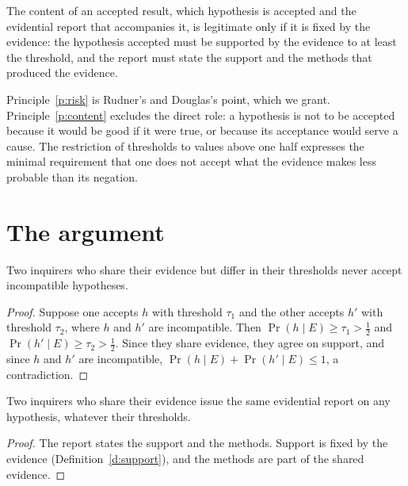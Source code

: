 \documentclass{situationist-preprint}
\begin{document}
\begin{principle}\label{p:content}
The content of an accepted result, which hypothesis is accepted and the evidential report that accompanies it, is legitimate only if it is fixed by the evidence: the hypothesis accepted must be supported by the evidence to at least the threshold, and the report must state the support and the methods that produced the evidence.
\end{principle}

Principle~\ref{p:risk} is Rudner's and Douglas's point, which we grant. Principle~\ref{p:content} excludes the direct role: a hypothesis is not to be accepted because it would be good if it were true, or because its acceptance would serve a cause. The restriction of thresholds to values above one half expresses the minimal requirement that one does not accept what the evidence makes less probable than its negation.

\section{The argument}

\begin{proposition}\label{p:noconflict}
Two inquirers who share their evidence but differ in their thresholds never accept incompatible hypotheses.
\end{proposition}

\begin{proof}
Suppose one accepts $h$ with threshold $\tau_1$ and the other accepts $h'$ with threshold $\tau_2$, where $h$ and $h'$ are incompatible. Then $\Pr(h \mid E) \ge \tau_1 > \tfrac12$ and $\Pr(h' \mid E) \ge \tau_2 > \tfrac12$. Since they share evidence, they agree on support, and since $h$ and $h'$ are incompatible, $\Pr(h \mid E) + \Pr(h' \mid E) \le 1$, a contradiction.
\end{proof}

\begin{proposition}\label{p:report}
Two inquirers who share their evidence issue the same evidential report on any hypothesis, whatever their thresholds.
\end{proposition}

\begin{proof}
The report states the support and the methods. Support is fixed by the evidence (Definition~\ref{d:support}), and the methods are part of the shared evidence.
\end{proof}
\end{document}
